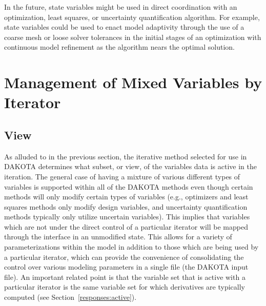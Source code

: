 In the future, state variables might be used in direct coordination
with an optimization, least squares, or uncertainty quantification
algorithm. For example, state variables could be used to enact model
adaptivity through the use of a coarse mesh or loose solver tolerances
in the initial stages of an optimization with continuous model
refinement as the algorithm nears the optimal solution.

\section{Management of Mixed Variables by Iterator}\label{variables:mixed}
\subsection{View}\label{variables:mixedview}
As alluded to in the previous section, the iterative method selected
for use in DAKOTA determines what subset, or view, of the variables
data is active in the iteration. The general case of having a mixture
of various different types of variables is supported within all of the
DAKOTA methods even though certain methods will only modify certain
types of variables (e.g., optimizers and least squares methods only
modify design variables, and uncertainty quantification methods 
typically only utilize uncertain variables).  
This implies that variables which are not under the
direct control of a particular iterator will be mapped through the
interface in an unmodified state. This allows for a variety of
parameterizations within the model in addition to those which are
being used by a particular iterator, which can provide the convenience
of consolidating the control over various modeling parameters in a
single file (the DAKOTA input file). An important related point is
that the variable set that is active with a particular iterator is the
same variable set for which derivatives are typically computed (see
Section~\ref{responses:active}).

